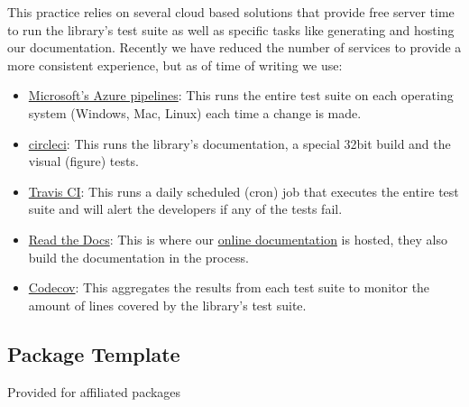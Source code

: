 This practice relies on several cloud based solutions that provide free server time to run the library's test suite as well as specific tasks like generating and hosting our documentation.
Recently we have reduced the number of services to provide a more consistent experience, but as of time of writing we use:
\begin{itemize}
\item \href{https://azure.microsoft.com/en-gb/services/devops/pipelines/}{Microsoft's Azure pipelines}: This runs the entire test suite on each operating system (Windows, Mac, Linux) each time a change is made.
\item \href{https://circleci.com}{circleci}: This runs the library's documentation, a special 32bit build and the visual (figure) tests.
\item \href{https://travis-ci.org}{Travis CI}: This runs a daily scheduled (cron) job that executes the entire test suite and will alert the developers if any of the tests fail.
\item \href{https://readthedocs.org/}{Read the Docs}: This is where our \href{http://docs.sunpy.org/en/stable/}{online documentation} is hosted, they also build the documentation in the process.
\item \href{https://codecov.io/}{Codecov}: This aggregates the results from each test suite to monitor the amount of lines covered by the library's test suite.
\end{itemize}


\subsection{Package Template}
Provided for affiliated packages